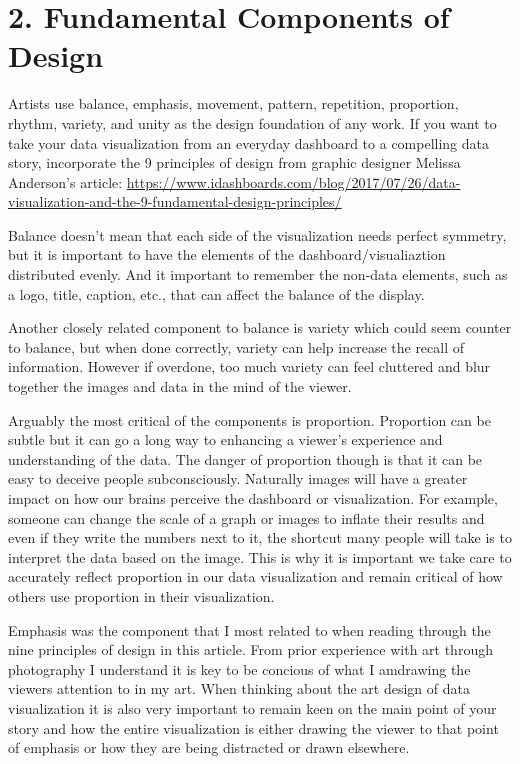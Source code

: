 \documentclass[]{book}
\theoremstyle{definition}
\theoremstyle{definition}
\theoremstyle{definition}
\theoremstyle{remark}
\begin{document}
\section{2. Fundamental Components of
Design}\label{fundamental-components-of-design-1}

Artists use balance, emphasis, movement, pattern, repetition,
proportion, rhythm, variety, and unity as the design foundation of any
work. If you want to take your data visualization from an everyday
dashboard to a compelling data story, incorporate the 9 principles of
design from graphic designer Melissa Anderson's article:
\url{https://www.idashboards.com/blog/2017/07/26/data-visualization-and-the-9-fundamental-design-principles/}

Balance doesn't mean that each side of the visualization needs perfect
symmetry, but it is important to have the elements of the
dashboard/visualiaztion distributed evenly. And it important to remember
the non-data elements, such as a logo, title, caption, etc., that can
affect the balance of the display.

Another closely related component to balance is variety which could seem
counter to balance, but when done correctly, variety can help increase
the recall of information. However if overdone, too much variety can
feel cluttered and blur together the images and data in the mind of the
viewer.

Arguably the most critical of the components is proportion. Proportion
can be subtle but it can go a long way to enhancing a viewer's
experience and understanding of the data. The danger of proportion
though is that it can be easy to deceive people subconsciously.
Naturally images will have a greater impact on how our brains perceive
the dashboard or visualization. For example, someone can change the
scale of a graph or images to inflate their results and even if they
write the numbers next to it, the shortcut many people will take is to
interpret the data based on the image. This is why it is important we
take care to accurately reflect proportion in our data visualization and
remain critical of how others use proportion in their visualization.

Emphasis was the component that I most related to when reading through
the nine principles of design in this article. From prior experience
with art through photography I understand it is key to be concious of
what I amdrawing the viewers attention to in my art. When thinking about
the art design of data visualization it is also very important to remain
keen on the main point of your story and how the entire visualization is
either drawing the viewer to that point of emphasis or how they are
being distracted or drawn elsewhere.
\end{document}
